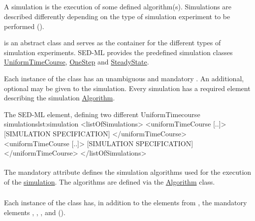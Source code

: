 \subsection{}
\label{class:simulation}
A simulation is the execution of some defined algorithm(s). Simulations are described differently depending on the type of simulation experiment to be performed (). 


 is an abstract class and serves as the container for the different types of simulation experiments. SED-ML \currentLV provides the predefined simulation classes \hyperref[class:uniformTimeCourse]{UniformTimeCourse}, \hyperref[class:oneStep]{OneStep} and \hyperref[class:steadyState]{SteadyState}. 

Each instance of the  class has an unambiguous and mandatory \hyperref[sec:id]{}. An additional, optional \hyperref[sec:name]{} may be given to the simulation. Every simulation has a required element \hyperref[class:algorithm]{} describing the simulation \hyperref[class:algorithm]{Algorithm}.

\begin{myXmlLst}{The SED-ML  element, defining two different UniformTimecourse simulations}{lst:simulation}
<listOfSimulations>
	<uniformTimeCourse [..]>
		[SIMULATION SPECIFICATION]
	</uniformTimeCourse>
	<uniformTimeCourse [..]>
		[SIMULATION SPECIFICATION]
	</uniformTimeCourse>
</listOfSimulations>
\end{myXmlLst}

\paragraph*{}
\label{sec:algorithm}
The mandatory attribute  defines the simulation algorithms used for the execution of the \hyperref[class:simulation]{simulation}. The algorithms are defined via the \hyperref[class:algorithm]{Algorithm} class.


\subsubsection{}
\label{class:uniformTimeCourse}
Each instance of the  class has, in addition to the elements from \Simulation, the mandatory elements \hyperref[sec:initialTime]{}, \hyperref[sec:outputStartTime]{}, \hyperref[sec:outputEndTime]{}, and \hyperref[sec:numberOfSteps]{} ().

